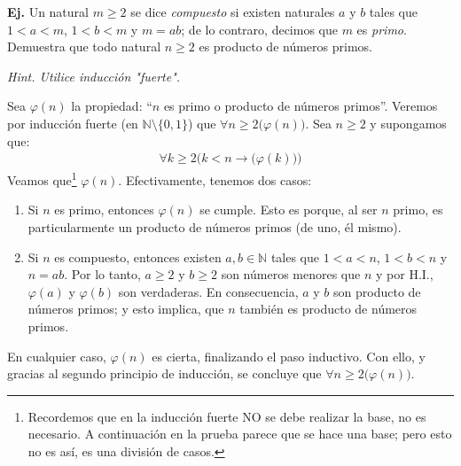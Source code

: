 \documentclass[letterpaper,DIV=14,headsepline,12pt]{scrartcl}
\makeatletter
\newcounter{Ejer}
\newcommand{\pts}{}
\newenvironment{ejercicio}[1]{\noindent
    \ifthenelse{\equal{#1}{1}}{\renewcommand{\pts}{\textbf{(#1 pt)}}}{\renewcommand{\pts}{\textbf{(#1 pts)}}}\textbf{Ej. \theEjer} \pts\stepcounter{Ejer}}{\vspace{.3cm}}
\renewenvironment{proof}[1][]{%
        \par\pushQED{\qed}%
        \normalfont\topsep6pt \partopsep0pt %
        \trivlist
        \item[\hskip\labelsep
                \textbf{\textit{Demostración.}}%
        ]#1
        }{%
        \popQED\endtrivlist\@endpefalse
    }
\makeatother
\begin{document}
    \begin{ejercicio}{2}
        Un natural $m\geq 2$ se dice \textit{compuesto} si existen naturales $a$ y $b$ tales que $1 < a < m$, $1 < b < m$ y $m = ab$; de lo contraro, decimos que $m$ es \textit{primo}. Demuestra que todo natural $n \geq 2$ es producto de números primos.

        \hfill \textit{Hint. Utilice inducción "fuerte".}
    \end{ejercicio}
    \begin{proof}
        Sea $\varphi(n)$ la propiedad: ``$n$ es primo o producto de números primos''. Veremos por inducción fuerte (en $\mathbb{N} \setminus \{0,1\}$) que $\forall n \geq 2 \big( \varphi(n) \big)$. Sea $n \geq 2$ y supongamos que:
        \begin{align*}
            \forall k \geq 2 \big( k< n \to \big( \varphi(k) \big) \big) \tag*{H.I.}
        \end{align*}
        Veamos que\footnote{Recordemos que en la inducción fuerte NO se debe realizar la base, no es necesario. A continuación en la prueba parece que se hace una base; pero esto no es así, es una división de casos.} $\varphi(n)$. Efectivamente, tenemos dos casos:
        \begin{enumerate}[\hspace{1cm} i)]
            \item Si $n$ es primo, entonces $\varphi(n)$ se cumple. Esto es porque, al ser $n$ primo, es particularmente un producto de números primos (de uno, {él mismo}).
            \item Si $n$ es compuesto, entonces existen $a,b \in \mathbb{N}$ tales que $1 < a < n$, $1 < b < n$ y $n = ab$. Por lo tanto, $a \geq 2$ y $b \geq 2$ son números menores que $n$ y por H.I., $\varphi(a)$ y $\varphi(b)$ son verdaderas. En consecuencia, $a$ y $b$ son producto de números primos; y esto implica, que $n$ también es producto de números primos.
        \end{enumerate}
        En cualquier caso, $\varphi(n)$ es cierta, finalizando el paso inductivo. Con ello, y gracias al segundo principio de inducción, se concluye que $\forall n \geq 2 \big( \varphi(n) \big)$.
    \end{proof}
\end{document}
